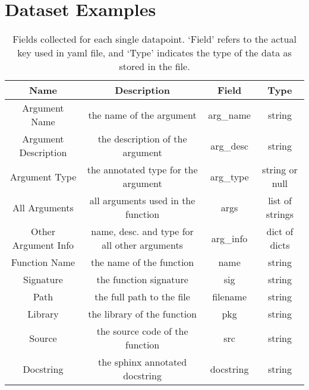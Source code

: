 \chapter{Dataset Examples}
\label{example_datapoint}


\begin{table}[h!]
    \begin{center}
    \begin{tabular}{| c | c | c | c |}
        \hline
        Name &  Description     &    Field    & Type  \\
        \hline
        Argument Name & the name of the argument  & arg\_name & string \\
        Argument Description & the description of the argument & arg\_desc & string \\
        Argument Type & the annotated type for the argument & arg\_type & string or null \\
        All Arguments & all arguments used in the function & args & list of strings \\
        Other Argument Info & name, desc. and type for all other arguments & arg\_info & dict of dicts\\
        Function Name & the name of the function & name & string\\
        Signature & the function signature & sig & string\\
        Path & the full path to the file & filename & string \\
        Library & the library of the function & pkg & string\\
        Source & the source code of the function & src & string\\
        Docstring & the sphinx annotated docstring & docstring & string\\

        \hline


    \end{tabular}
    \caption {Fields collected for each single datapoint. `Field' refers to the actual key used in yaml file, and `Type' indicates the type of the data as stored in the file.}
    \label{table:metadata}
    \end{center}
\end{table}




